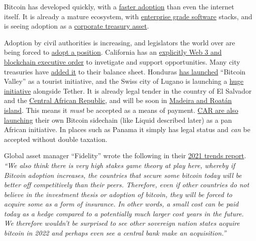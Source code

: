 Bitcoin has developed quickly, with a \href{https://phemex.com/blogs/crypto-bitcoin-s-curve-adoption-curve}{faster adoption} than even the internet itself. It is already a mature ecosystem, with \href{https://www.fortris.com/}{enterprise grade software} stacks, and is seeing adoption as a \href{https://bitcointreasuries.net/}{corporate treasury asset}. \par
Adoption by civil authorities is increasing, and legislators the world over are being forced to \href{https://www.politico.com/news/2022/01/16/bitcoin-crashes-the-midterms-527126}{adopt a position}. California has an \href{https://www.gov.ca.gov/2022/05/04/governor-newsom-signs-blockchain-executive-order-to-spur-responsible-web3-innovation-grow-jobs-and-protect-consumers/}{explicitly Web 3 and blockchain executive order} to invetigate and support opportunities. Many city treasuries have \href{https://www.bloomberg.com/news/articles/2022-01-14/rio-de-janeiro-wants-to-become-brazil-s-cryptocurrency-capital}{added it} to their balance sheet. Honduras \href{https://www.reuters.com/world/americas/honduras-launches-bitcoin-valley-tourist-town-santa-lucia-2022-07-29/}{has launched} ``Bitcoin Valley'' as a tourist initiative, and the Swiss city of Lugano is launching a \href{https://twitter.com/Stadicus3000/status/1499656424422526977}{huge initiative} alongside Tether. It is already legal tender in the country of El Salvador\cite{oxford2021salvador} and the \href{https://finance.yahoo.com/news/central-african-republic-passes-bill-180910797.html?}{Central African Republic}, and will be soon in \href{https://www.forbes.com/sites/ninabambysheva/2022/04/07/two-new-territories-are-adopting-bitcoin/?sh=7f014ed2499a}{Madeira and Roatán island}. This means it \textit{must} be accepted as a means of payment. \href{https://www.theblock.co/post/157766/central-african-republic-set-to-launch-sango-bitcoin-sidechain?}{CAR are also launching} their own Bitcoin sidechain (like Liquid described later) as a pan African initiative. In places such as Panama it simply has legal status and \textit{can} be accepted without double taxation.\par 
Global asset manager ``Fidelity'' wrote the following in their \href{https://www.fidelitydigitalassets.com/articles/2021-trends-impact}{2021 trends report}. \textit{``We also think there is very high stakes game theory at play here, whereby if Bitcoin adoption increases, the countries that secure some bitcoin today will be better off competitively than their peers. Therefore, even if other countries do not believe in the investment thesis or adoption of bitcoin, they will be forced to acquire some as a form of insurance. In other words, a small cost can be paid today as a hedge compared to a potentially much larger cost years in the future. We therefore wouldn't be surprised to see other sovereign nation states acquire bitcoin in 2022 and perhaps even see a central bank make an acquisition.''}\par
